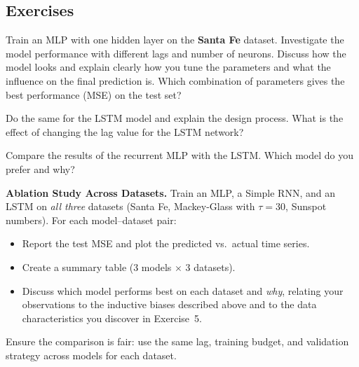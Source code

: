 
\subsection*{Exercises}
\begin{questions}
    \item Train an MLP with one hidden layer on the \textbf{Santa Fe} dataset.
    Investigate the model performance with different lags and number of neurons.
    Discuss how the model looks and explain clearly how you tune the parameters and what the influence on the final prediction is.
    Which combination of parameters gives the best performance (MSE) on the test set?
	\item Do the same for the LSTM model and explain the design process.
    What is the effect of changing the lag value for the LSTM network?
	\item Compare the results of the recurrent MLP with the LSTM. Which model do you prefer and why?

    \item \textbf{Ablation Study Across Datasets.}\;
    Train an MLP, a Simple RNN, and an LSTM on \emph{all three} datasets (Santa Fe, Mackey-Glass with $\tau{=}30$, Sunspot numbers).
    For each model--dataset pair:
    \begin{itemize}
        \item Report the test MSE and plot the predicted vs.\ actual time series.
        \item Create a summary table (3 models $\times$ 3 datasets).
        \item Discuss which model performs best on each dataset and \emph{why}, relating your observations to the inductive biases described above and to the data characteristics you discover in Exercise~5.
    \end{itemize}
    Ensure the comparison is fair: use the same lag, training budget, and validation strategy across models for each dataset.


\end{questions}

